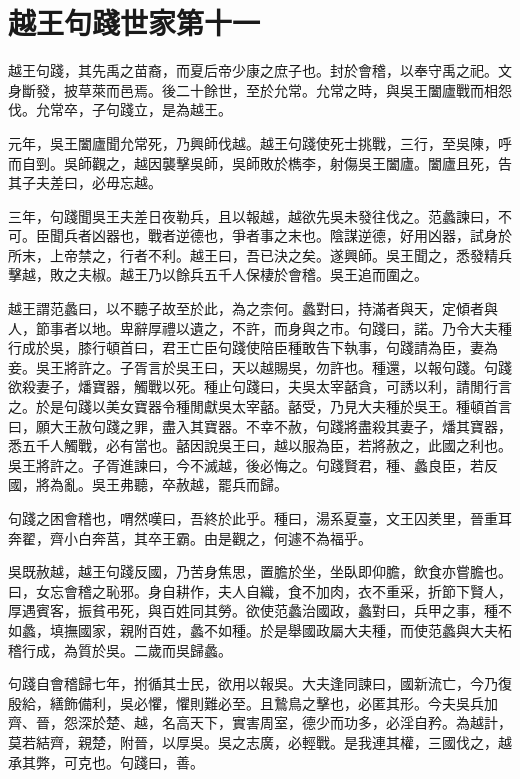 \chapter{越王句踐世家第十一}

越王句踐，其先禹之苗裔，而夏后帝少康之庶子也。封於會稽，以奉守禹之祀。文身斷發，披草萊而邑焉。後二十餘世，至於允常。允常之時，與吳王闔廬戰而相怨伐。允常卒，子句踐立，是為越王。

元年，吳王闔廬聞允常死，乃興師伐越。越王句踐使死士挑戰，三行，至吳陳，呼而自剄。吳師觀之，越因襲擊吳師，吳師敗於檇李，射傷吳王闔廬。闔廬且死，告其子夫差曰，必毋忘越。

三年，句踐聞吳王夫差日夜勒兵，且以報越，越欲先吳未發往伐之。范蠡諫曰，不可。臣聞兵者凶器也，戰者逆德也，爭者事之末也。陰謀逆德，好用凶器，試身於所末，上帝禁之，行者不利。越王曰，吾已決之矣。遂興師。吳王聞之，悉發精兵擊越，敗之夫椒。越王乃以餘兵五千人保棲於會稽。吳王追而圍之。

越王謂范蠡曰，以不聽子故至於此，為之柰何。蠡對曰，持滿者與天，定傾者與人，節事者以地。卑辭厚禮以遺之，不許，而身與之市。句踐曰，諾。乃令大夫種行成於吳，膝行頓首曰，君王亡臣句踐使陪臣種敢告下執事，句踐請為臣，妻為妾。吳王將許之。子胥言於吳王曰，天以越賜吳，勿許也。種還，以報句踐。句踐欲殺妻子，燔寶器，觸戰以死。種止句踐曰，夫吳太宰嚭貪，可誘以利，請閒行言之。於是句踐以美女寶器令種閒獻吳太宰嚭。嚭受，乃見大夫種於吳王。種頓首言曰，願大王赦句踐之罪，盡入其寶器。不幸不赦，句踐將盡殺其妻子，燔其寶器，悉五千人觸戰，必有當也。嚭因說吳王曰，越以服為臣，若將赦之，此國之利也。吳王將許之。子胥進諫曰，今不滅越，後必悔之。句踐賢君，種、蠡良臣，若反國，將為亂。吳王弗聽，卒赦越，罷兵而歸。

句踐之困會稽也，喟然嘆曰，吾終於此乎。種曰，湯系夏臺，文王囚羑里，晉重耳奔翟，齊小白奔莒，其卒王霸。由是觀之，何遽不為福乎。

吳既赦越，越王句踐反國，乃苦身焦思，置膽於坐，坐臥即仰膽，飲食亦嘗膽也。曰，女忘會稽之恥邪。身自耕作，夫人自織，食不加肉，衣不重采，折節下賢人，厚遇賓客，振貧弔死，與百姓同其勞。欲使范蠡治國政，蠡對曰，兵甲之事，種不如蠡，填撫國家，親附百姓，蠡不如種。於是舉國政屬大夫種，而使范蠡與大夫柘稽行成，為質於吳。二歲而吳歸蠡。

句踐自會稽歸七年，拊循其士民，欲用以報吳。大夫逢同諫曰，國新流亡，今乃復殷給，繕飾備利，吳必懼，懼則難必至。且鷙鳥之擊也，必匿其形。今夫吳兵加齊、晉，怨深於楚、越，名高天下，實害周室，德少而功多，必淫自矜。為越計，莫若結齊，親楚，附晉，以厚吳。吳之志廣，必輕戰。是我連其權，三國伐之，越承其弊，可克也。句踐曰，善。

